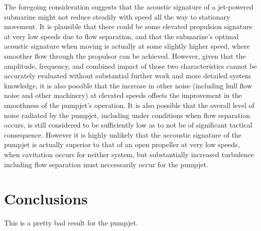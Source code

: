 \documentclass{article}\usepackage[]{graphicx}\usepackage[]{color}
\begin{document}
The foregoing consideration suggests that the acoustic signature of a jet-powered submarine might not reduce steadily with speed all the way to stationary movement.  It is plausible that there could be some elevated propulsion signature at very low speeds due to flow separation, and that the submarine's optimal acoustic signature when moving is actually at some slightly higher speed, where smoother flow through the propulsor can be achieved.  However, given that the amplitude, frequency, and combined impact of those two characteristics cannot be accurately evaluated without substantial further work and more detailed system knowledge, it is also possible that the increase in other noise (including hull flow noise and other machinery) at elevated speeds offsets the improvement in the smoothness of the pumpjet's operation.  It is also possible that the overall level of noise radiated by the pumpjet, including under conditions when flow separation occurs, is still considered to be sufficiently low as to not be of significant tactical consequence.  However it is highly unlikely that the accoustic signature of the pumpjet is actually superior to that of an open propeller at very low speeds, when cavitation occurs for neither system, but substantially increased turbulence including flow separation must neccessarily occur for the pumpjet.

\section{Conclusions}
This is a pretty bad result for the pumpjet.

\printbibliography
\end{document}

